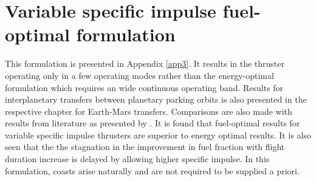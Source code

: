 \section{Variable specific impulse fuel-optimal formulation}
This formulation is presented in Appendix \ref{app3}. It results in the thruster operating only in a few operating modes rather than the energy-optimal formulation which requires an wide continuous operating band. Results for interplanetary transfers between planetary parking orbits is also presented in the respective chapter for Earth-Mars transfers. Comparisons are also made with results from literature as presented by \cite{genta_optimal_2016}. It is found that fuel-optimal results for variable specific impulse thrusters are superior to energy optimal results. It is also seen that the the stagnation in the improvement in fuel fraction with flight duration increase is delayed by allowing higher specific impulse. In this formulation, coasts arise naturally and are not required to be supplied a priori.